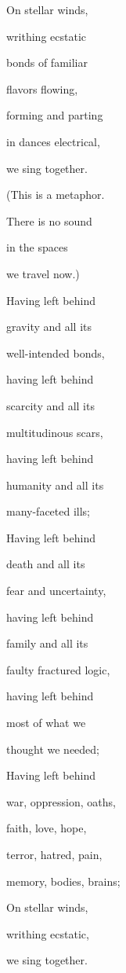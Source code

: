 On stellar winds,

writhing ecstatic

bonds of familiar

flavors flowing,

forming and parting

in dances electrical,

we sing together.

(This is a metaphor.

There is no sound

in the spaces

we travel now.)

Having left behind

gravity and all its

well-intended bonds,

having left behind

scarcity and all its

multitudinous scars,

having left behind

humanity and all its

many-faceted ills;

Having left behind

death and all its

fear and uncertainty,

having left behind

family and all its

faulty fractured logic,

having left behind

most of what we

thought we needed;

Having left behind

war, oppression, oaths,

faith, love, hope,

terror, hatred, pain,

memory, bodies, brains;

On stellar winds,

writhing ecstatic,

we sing together.
